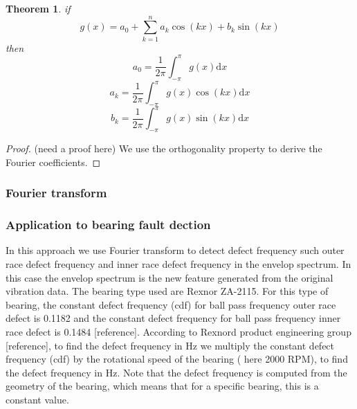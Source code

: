 \documentclass[11pt, oneside]{article}   	%
\newtheorem{theorem}{Theorem}
\newtheorem{proof}{Proof}
\begin{document}
\begin{theorem}
if 
\begin{equation}
g(x) = a_{0} + \sum_{k=1}^{n}a_{k}\cos(kx)+b_{k}\sin(kx)
\end{equation}
then 
\begin{equation}
a_{0} = \frac{1}{2\pi}\int_{-\pi}^{\pi}g(x)\mathrm{d}x
\end{equation}
\begin{equation}
a_{k} = \frac{1}{2\pi}\int_{-\pi}^{\pi}g(x)\cos(kx)\mathrm{d}x
\end{equation}
\begin{equation}
b_{k} = \frac{1}{2\pi}\int_{-\pi}^{\pi}g(x)\sin(kx)\mathrm{d}x
\end{equation}
\end{theorem}

\begin{proof}
(need a proof here) We use the orthogonality property to derive the Fourier coefficients.
\end{proof}






\subsubsection{Fourier transform}








\subsubsection{Application to bearing fault dection}
In this approach we use Fourier transform to detect defect frequency such outer race defect frequency and inner race defect frequency in the envelop spectrum. In this case the envelop spectrum is the new feature generated from the original vibration data. The bearing type used are Rexnor ZA-2115. For this type of bearing, the constant defect frequency (cdf) for ball pass frequency outer race defect is 0.1182 and the constant defect frequency for ball pass frequency inner race defect is 0.1484 [reference]. According to Rexnord product engineering group [reference], to find the defect frequency in Hz we multiply the constant defect frequency (cdf) by the rotational speed of the bearing ( here 2000 RPM), to find the defect frequency in Hz. Note that the defect frequency is computed from the geometry of the bearing, which means that for a specific bearing, this is a constant value. 
\end{document}
